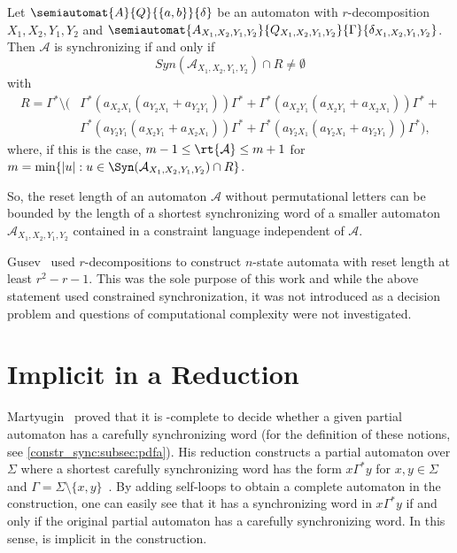 \begin{proposition}
		 Let $\semiautomat{A}{Q}{\{a,b\}}{\delta}$ be an automaton with $r$-decomposition $X_1, X_2, Y_1, Y_2$
		 and $\semiautomat{A_{X_1, X_2, Y_1, Y_2}}{Q_{X_1, X_2, Y_1, Y_2}}{\Gamma}{\delta_{X_1,X_2, Y_1, Y_2}}$.
		 Then $\mathcal A$ is synchronizing if and only if 
		 \[ Syn(\mathcal A_{X_1, X_2, Y_1, Y_2}) \cap R \ne \emptyset
		 \] 
		 with
		 \begin{align*}
		 	R = \Gamma^* \setminus \big(
		 	& \Gamma^* ( a_{X_2 X_1} ( a_{Y_2 X_1} + a_{Y_2 Y_1} ) ) \Gamma^* + 
		 	\Gamma^* ( a_{X_2 Y_1} ( a_{X_2 Y_1} + a_{X_2 X_1} ) ) \Gamma^* + \\ 
		 	& \Gamma^* ( a_{Y_2 Y_1} ( a_{X_2 Y_1} + a_{X_2 X_1} ) ) \Gamma^* + 
		 	\Gamma^* ( a_{Y_2 X_1} ( a_{Y_2 X_1} + a_{Y_2 Y_1} ) ) \Gamma^* \big),
		 \end{align*}
	     where, if this is the case, $m - 1 \le \rt{\mathcal A} \le m + 1$
	     for  $m = \min\{ |u| : u \in \Syn(\mathcal A_{X_1, X_2, Y_1, Y_2}) \cap R  \}$.
\end{proposition}

So, the reset length of an automaton $\mathcal A$ without permutational letters can be bounded by the length of a shortest synchronizing word 
of a smaller automaton $\mathcal A_{X_1, X_2, Y_1, Y_2}$ contained in a constraint language independent of $\mathcal A$.

Gusev~\cite{Gusev2012} used $r$-decompositions to construct $n$-state automata 
with reset length at least $r^2 - r - 1$. This was the sole purpose of this work
and while the above statement used constrained synchronization, it was not introduced
as a decision problem and questions of computational complexity were not 
investigated.

\section{Implicit in a Reduction}
\label{constrsync:sec:motivation:implicit}

Martyugin~\cite{Martyugin14} 
proved that it is \PSPACE-complete to decide whether a given partial automaton
has a carefully synchronizing word (for the definition of these notions, see \cref{constr_sync:subsec:pdfa}).
His reduction constructs a partial automaton over $\Sigma$
where a shortest carefully synchronizing 
word has the form $x\Gamma^*y$ for $x,y \in \Sigma$ and $\Gamma = \Sigma \setminus \{x,y\}$~\cite[Lem.~1]{Martyugin14}.
By adding self-loops to obtain 
a complete automaton in the construction,
one can easily see that it has a synchronizing word in $x\Gamma^*y$
if and only if the original partial automaton
has a carefully synchronizing word.
In this sense,  is implicit
in the construction. 

